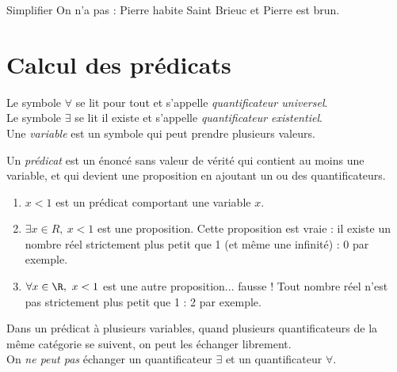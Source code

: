 \documentclass[a4paper,12pt,french]{book}
\begin{document}
\begin{exercice}[]
	Simplifier \og On n'a pas : Pierre habite Saint Brieuc et Pierre est brun\fg{}.
\end{exercice}


\section{Calcul des prédicats}

\begin{definition}

	Le symbole $\forall$ se lit \og pour tout\fg{} et s'appelle \textit{quantificateur universel}.\\
	Le symbole $\exists$ se lit \og il existe\fg{} et s'appelle \textit{quantificateur existentiel}.\\

	Une \textit{variable} est un symbole qui peut prendre plusieurs valeurs.

	Un \textit{prédicat} est un énoncé sans valeur de vérité qui contient au moins une variable, et qui devient une proposition en ajoutant un ou des quantificateurs.
\end{definition}

\begin{exemple}[s]
	\begin{enumerate}[\textbullet]
		\item 	\og $x<1$\fg{} est un prédicat comportant une variable $x$.
		\item 	$\exists x\in R,\ x<1$ est une proposition. Cette proposition est vraie : il existe un nombre réel strictement plus petit que 1 (et même une infinité) : 0 par exemple.
		\item 	$\forall x\in\R,\ x<1$ est une autre proposition... fausse ! Tout nombre réel n'est pas strictement plus petit que 1 : 2 par exemple.
	\end{enumerate}
\end{exemple}

\begin{propriete}
	Dans un prédicat à plusieurs variables, quand plusieurs quantificateurs de la même catégorie se suivent, on peut les échanger librement.\\
	On \textit{ne peut pas} échanger un quantificateur $\exists$ et un quantificateur $\forall$.
\end{propriete}
\end{document}
